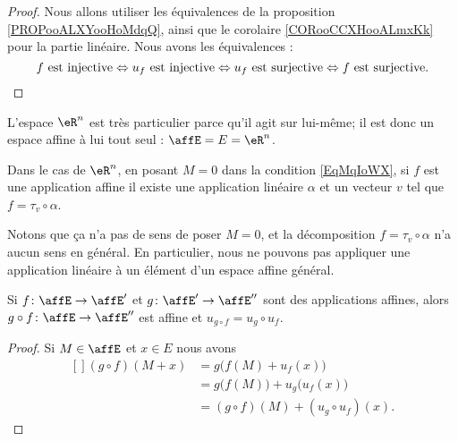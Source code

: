 \begin{proof}
	Nous allons utiliser les équivalences de la proposition \ref{PROPooALXYooHoMdqQ}, ainsi que le corolaire \ref{CORooCCXHooALmxKk} pour la partie linéaire. Nous avons les équivalences :
	\begin{equation}
		\text{\( f\) est injective} \Leftrightarrow \text{\( u_f\) est injective} \Leftrightarrow \text{\( u_f\) est surjective} \Leftrightarrow \text{\( f\) est surjective}.
	\end{equation}
\end{proof}

\begin{example}     \label{EXooAGINooYmvPML}
	L'espace \( \eR^n\) est très particulier parce qu'il agit sur lui-même; il est donc un espace affine à lui tout seul : \( \affE=E=\eR^n\).

	Dans le cas de \( \eR^n\), en posant \( M=0\) dans la condition \eqref{EqMqIoWX}, si \( f\) est une application affine il existe une application linéaire \( \alpha\) et un vecteur \( v\) tel que \( f=\tau_v\circ \alpha\).

	Notons que ça n'a pas de sens de poser \( M=0\), et la décomposition \( f=\tau_v\circ \alpha\) n'a aucun sens en général. En particulier, nous ne pouvons pas appliquer une application linéaire à un élément d'un espace affine général.
\end{example}

\begin{proposition}     \label{PROPooOUNEooQUZetW}
	Si \( f\colon \affE\to \affE'\) et \( g\colon \affE'\to \affE''\) sont des applications affines, alors \( g\circ f\colon \affE\to \affE''\) est affine et \( u_{g\circ f}=u_g\circ u_f\).
\end{proposition}

\begin{proof}
	Si \( M\in\affE\) et \( x\in E\) nous avons
	\begin{equation}
		\begin{aligned}[]
			(g\circ f)(M+x) & =g\big( f(M)+u_f(x) \big)                \\
			                & =g\big( f(M) \big)+u_g\big( u_f(x) \big) \\
			                & =(g\circ f)(M)+(u_g\circ u_f)(x).
		\end{aligned}
	\end{equation}
\end{proof}

